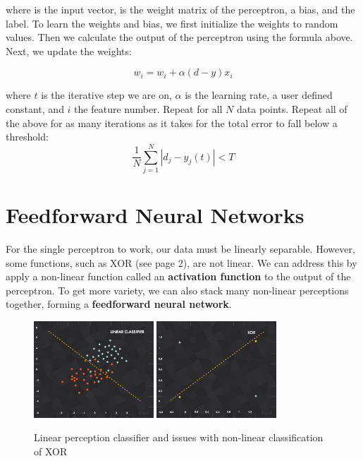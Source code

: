 \documentclass{article}
\let\vec\mathbf
\begin{document}
where \vec{x} is the input vector, \vec{w} is the weight matrix of the perceptron, \vec{b} a bias, and \vec{y} the label. To learn the weights and bias, we first initialize the weights to random values. Then we calculate the output of the perceptron using the formula above. Next, we update the weights: 

$$ w_i = w_i + \alpha(d - y)x_{i}$$

where $t$ is the iterative step we are on, $\alpha$ is the learning rate, a user defined constant, and $i$ the feature number. Repeat for all $N$ data points. Repeat all of the above for as many iterations as it takes for the total error to fall below a threshold:
$$\frac{1}{N}\sum_{j=1}^{N}|d_j-y_j(t)| < T$$

\section{Feedforward Neural Networks}
For the single perceptron to work, our data must be linearly separable. However, some functions, such as XOR (see page 2), are not linear. We can address this by apply a non-linear function called an \textbf{activation function} to the output of the perceptron. To get more variety, we can also stack many non-linear perceptions together, forming a \textbf{feedforward neural network}.

\begin{figure}[H]
    \begin{center}
        \includegraphics[width=0.4\textwidth]{img1.jpg}
        \hspace{15pt}
        \includegraphics[width=0.4\textwidth]{img2.jpg}
    \end{center}
    \vspace{-10pt}
    \caption{Linear perception classifier and issues with non-linear classification of XOR}
\end{figure}
\end{document}

